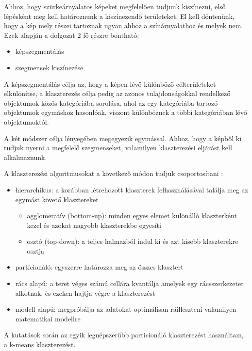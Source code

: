

Ahhoz, hogy szürkeárnyalatos képeket megfelelően tudjunk kiszínezni, első lépésként meg kell határoznunk a kiszínezendő területeket. El kell döntenünk, hogy a kép mely részei tartoznak ugyan ahhoz a színárnyalathoz és melyek nem. Ezek alapján a dolgozat 2 fő részre bontható:
\begin{itemize}
\item képszegmentálás
\item szegmensek kiszínezése
\end{itemize}

A képszegmentálás célja az, hogy a képen lévő különböző célterületeket elkülönítse, a klaszterezés célja pedig az azonos tulajdonságokkal rendelkező objektumok közös kategóriába sorolása, ahol az egy kategóriába tartozó objektumok egymáshoz hasonlóak, viszont különböznek a többi kategóriában lévő objektumoktól.

A két módszer célja lényegében megegyezik egymással. Ahhoz, hogy a képből ki tudjuk nyerni a megfelelő szegmenseket, valamilyen klaszterezési eljárást kell alkalmaznunk.

A klaszterezési algoritmusokat a következő módon tudjuk csoportosítani \cite{clustering}:
\begin{itemize}
\item hierarchikus: a korábban létrehozott klaszterek felhasználásával találja meg az egymást követő klasztereket
    \begin{itemize}
    \item agglomeratív (bottom-up): minden egyes elemet különálló klaszterként kezel és azokat nagyobb klaszterekbe egyesíti
    \item osztó (top-down): a teljes halmazból indul ki és azt kisebb klaszterekre osztja
    \end{itemize}
\item partícionáló: egyszerre határozza meg az összes klasztert
\item rács alapú: a teret véges számú cellára kvantálja amelyek egy rácsszerkezetet alkotnak, és ezeken hajtja végre a klaszterezést
\item modell alapú: megpróbálja az adatokat optimálisan ráilleszteni valamilyen matematikai modellre
\end{itemize}

A kutatások során az egyik legnépszerűbb particionáló klaszterezést használtam, a k-means klaszterezést.

